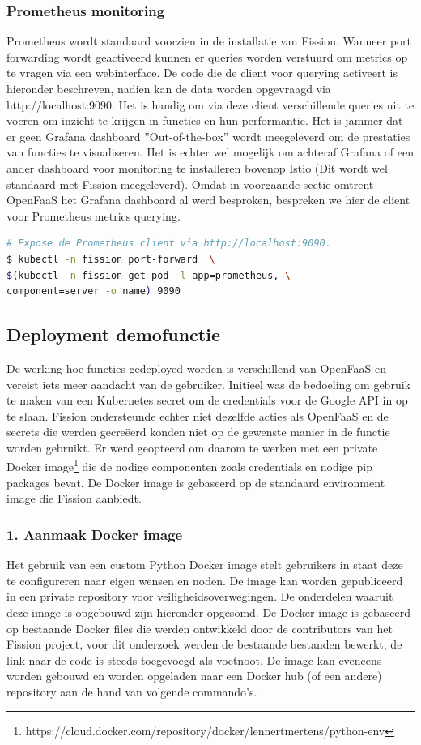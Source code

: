 \subsubsection{Prometheus monitoring}
Prometheus wordt standaard voorzien in de installatie van Fission. Wanneer port forwarding wordt geactiveerd kunnen er queries worden verstuurd om metrics op te vragen via een webinterface. De code die de client voor querying activeert is hieronder beschreven, nadien kan de data worden opgevraagd via http://localhost:9090. Het is handig om via deze client verschillende queries uit te voeren om inzicht te krijgen in functies en hun performantie. Het is jammer dat er geen Grafana dashboard ''Out-of-the-box'' wordt meegeleverd om de prestaties van functies te visualiseren. Het is echter wel mogelijk om achteraf Grafana of een ander dashboard voor monitoring te installeren bovenop Istio (Dit wordt wel standaard met Fission meegeleverd). Omdat in voorgaande sectie omtrent OpenFaaS het Grafana dashboard al werd besproken, bespreken we hier de client voor Prometheus metrics querying.

\begin{lstlisting}[language=bash]
# Expose de Prometheus client via http://localhost:9090.
$ kubectl -n fission port-forward  \ 
$(kubectl -n fission get pod -l app=prometheus, \
component=server -o name) 9090
\end{lstlisting}

\subsection{Deployment demofunctie}
De werking hoe functies gedeployed worden is verschillend van OpenFaaS en vereist iets meer aandacht van de gebruiker. Initieel was de bedoeling om gebruik te maken van een Kubernetes secret om de credentials voor de Google API in op te slaan. Fission ondersteunde echter niet dezelfde acties als OpenFaaS en de secrets die werden gecreëerd konden niet op de gewenste manier in de functie worden gebruikt. Er werd geopteerd om daarom te werken met een private Docker image\footnote{https://cloud.docker.com/repository/docker/lennertmertens/python-env} die de nodige componenten zoals credentials en nodige pip packages bevat. De Docker image is gebaseerd op de standaard environment image die Fission aanbiedt.

\subsubsection{1. Aanmaak Docker image}
Het gebruik van een custom Python Docker image stelt gebruikers in staat deze te configureren naar eigen wensen en noden. De image kan worden gepubliceerd in een private repository voor veiligheidsoverwegingen. De onderdelen waaruit deze image is opgebouwd zijn hieronder opgesomd. De Docker image is gebaseerd op bestaande Docker files die werden ontwikkeld door de contributors van het Fission project, voor dit onderzoek werden de bestaande bestanden bewerkt, de link naar de code is steeds toegevoegd als voetnoot. De image kan eveneens worden gebouwd en worden opgeladen naar een Docker hub (of een andere) repository aan de hand van volgende commando's.

